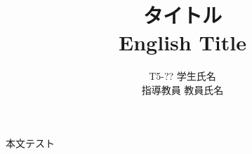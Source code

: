 \documentclass[a4paper,10pt]{ltjsarticle}
\title{\huge タイトル \\
\Large English Title }
\author{
T5-?? \: 学生氏名\\
指導教員 \: 教員氏名
}
\date{}
\begin{document}
\twocolumn[
  \maketitle
]

本文テスト


\end{document}
